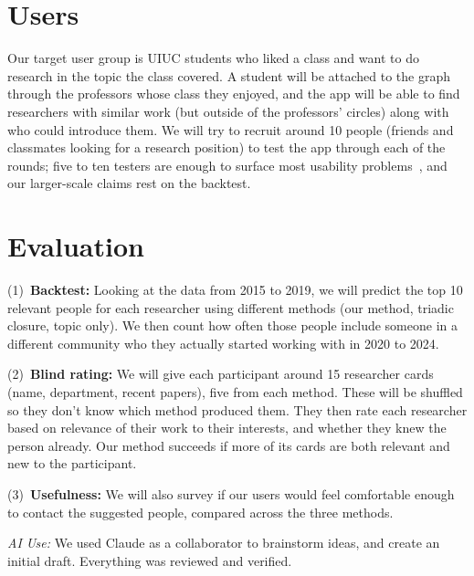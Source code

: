 \documentclass[sigconf,nonacm]{acmart}
\begin{document}
\section{Users}
Our target user group is UIUC students who liked a class and want to do research in the topic the class covered. A student will be attached to the graph through the professors whose class they enjoyed, and the app will be able to find researchers with similar work (but outside of the professors' circles) along with who could introduce them. We will try to recruit around 10 people (friends and classmates looking for a research position) to test the app through each of the rounds; five to ten testers are enough to surface most usability problems~\cite{nielsen1993}, and our larger-scale claims rest on the backtest. 

\section{Evaluation}

(1)~\textbf{Backtest:} Looking at the data from 2015 to 2019, we will predict the top 10 relevant people for each researcher using different methods (our method, triadic closure, topic only). We then count how often those people include someone in a different community who they actually started working with in 2020 to 2024.

\noindent(2)~\textbf{Blind rating: } We will give each participant around 15 researcher cards (name, department, recent papers), five from each method. These will be shuffled so they don't know which method produced them. They then rate each researcher based on relevance of their work to their interests, and whether they knew the person already. Our method succeeds if more of its cards are both relevant and new to the participant.

\noindent(3)~\textbf{Usefulness: } We will also survey if our users would feel comfortable enough to contact the suggested people, compared across the three methods.

\noindent\emph{AI Use:} We used Claude as a collaborator to brainstorm ideas, and create an initial draft. Everything was reviewed and verified. 



\end{document}
